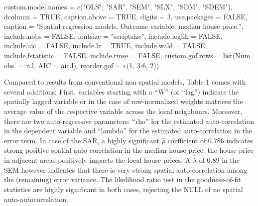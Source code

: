 \documentclass[
  letterpaper,
  DIV=11,
  numbers=noendperiod]{scrreprt}
\newenvironment{Shaded}{\begin{snugshade}}{\end{snugshade}}
\newcommand{\AttributeTok}[1]{\textcolor[rgb]{0.40,0.45,0.13}{#1}}
\newcommand{\ConstantTok}[1]{\textcolor[rgb]{0.56,0.35,0.01}{#1}}
\newcommand{\DecValTok}[1]{\textcolor[rgb]{0.68,0.00,0.00}{#1}}
\newcommand{\FunctionTok}[1]{\textcolor[rgb]{0.28,0.35,0.67}{#1}}
\newcommand{\NormalTok}[1]{\textcolor[rgb]{0.00,0.23,0.31}{#1}}
\newcommand{\OtherTok}[1]{\textcolor[rgb]{0.00,0.23,0.31}{#1}}
\newcommand{\SpecialCharTok}[1]{\textcolor[rgb]{0.37,0.37,0.37}{#1}}
\newcommand{\StringTok}[1]{\textcolor[rgb]{0.13,0.47,0.30}{#1}}
\begin{document}
\begin{Shaded}
\begin{Highlighting}[]
          \AttributeTok{custom.model.names =} \FunctionTok{c}\NormalTok{(}\StringTok{"OLS"}\NormalTok{, }\StringTok{"SAR"}\NormalTok{, }\StringTok{"SEM"}\NormalTok{, }\StringTok{"SLX"}\NormalTok{, }\StringTok{"SDM"}\NormalTok{, }\StringTok{"SDEM"}\NormalTok{),}
          \AttributeTok{dcolumn =} \ConstantTok{TRUE}\NormalTok{, }\AttributeTok{caption.above =} \ConstantTok{TRUE}\NormalTok{, }\AttributeTok{digits =} \DecValTok{3}\NormalTok{, }\AttributeTok{use.packages =} \ConstantTok{FALSE}\NormalTok{,}
          \AttributeTok{caption =} \StringTok{"Spatial regression models. Outcome variable: median house price."}\NormalTok{,}
          \AttributeTok{include.nobs =} \ConstantTok{FALSE}\NormalTok{, }\AttributeTok{fontsize =} \StringTok{"scriptsize"}\NormalTok{,}
  \AttributeTok{include.loglik =} \ConstantTok{FALSE}\NormalTok{,}
  \AttributeTok{include.aic =} \ConstantTok{FALSE}\NormalTok{,}
  \AttributeTok{include.lr =} \ConstantTok{TRUE}\NormalTok{,}
  \AttributeTok{include.wald =} \ConstantTok{FALSE}\NormalTok{,}
  \AttributeTok{include.fstatistic =} \ConstantTok{FALSE}\NormalTok{,}
  \AttributeTok{include.rmse =} \ConstantTok{FALSE}\NormalTok{,}
  \AttributeTok{custom.gof.rows =} \FunctionTok{list}\NormalTok{(}\StringTok{\textquotesingle{}Num. obs.\textquotesingle{}} \OtherTok{=}\NormalTok{ n.l, }
                         \StringTok{\textquotesingle{}AIC\textquotesingle{}} \OtherTok{=}\NormalTok{ aic.l), }
  \AttributeTok{reorder.gof =} \FunctionTok{c}\NormalTok{(}\DecValTok{1}\NormalTok{, }\DecValTok{3}\SpecialCharTok{:}\DecValTok{6}\NormalTok{, }\DecValTok{2}\NormalTok{))}
\end{Highlighting}
\end{Shaded}



Compared to results from conventional non-spatial models, Table 1 comes
with several additions: First, variables starting with a ``W'' (or
``lag'') indicate the spatially lagged variable or in the case of
row-normalized weights matrices the average value of the respective
variable across the local neighbours. Moreover, there are two
auto-regressive parameters: ``rho'' for the estimated auto-correlation
in the dependent variable and ``lambda'' for the estimated
auto-correlation in the error term. In case of the SAR, a highly
significant \(\hat\rho\) coefficient of 0.786 indicates strong positive
spatial auto-correlation in the median house price: the house price in
adjacent areas positively impacts the focal house prices. A
\(\hat\lambda\) of 0.89 in the SEM however indicates that there is very
strong spatial auto-correlation among the (remaining) error variance.
The likelihood ratio test in the goodness-of-fit statistics are highly
significant in both cases, rejecting the NULL of no spatial
auto-autocorrelation.
\end{document}
